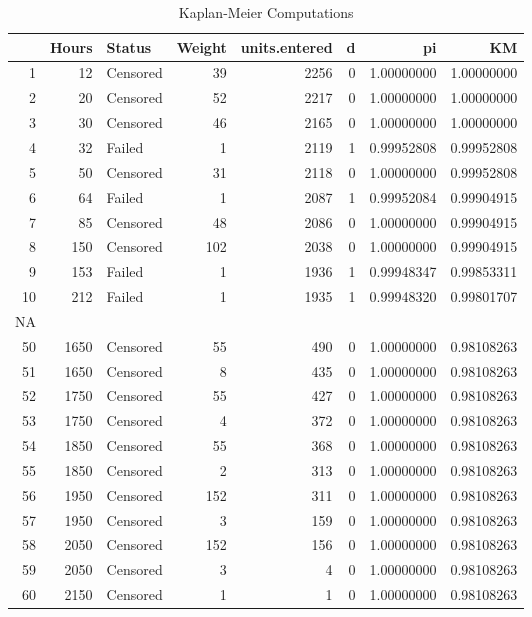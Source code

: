 \documentclass{article}
\begin{document}
\begin{center}
\begin{table}[ht]
\begin{center}
\begin{tabular}{rrlrrrrr}
  \hline
 & Hours & Status & Weight & units.entered & d & pi & KM \\ 
  \hline
1 & 12 & Censored & 39 & 2256 & 0 & 1.00000000 & 1.00000000 \\ 
  2 & 20 & Censored & 52 & 2217 & 0 & 1.00000000 & 1.00000000 \\ 
  3 & 30 & Censored & 46 & 2165 & 0 & 1.00000000 & 1.00000000 \\ 
  4 & 32 & Failed & 1 & 2119 & 1 & 0.99952808 & 0.99952808 \\ 
  5 & 50 & Censored & 31 & 2118 & 0 & 1.00000000 & 0.99952808 \\ 
  6 & 64 & Failed & 1 & 2087 & 1 & 0.99952084 & 0.99904915 \\ 
  7 & 85 & Censored & 48 & 2086 & 0 & 1.00000000 & 0.99904915 \\ 
  8 & 150 & Censored & 102 & 2038 & 0 & 1.00000000 & 0.99904915 \\ 
  9 & 153 & Failed & 1 & 1936 & 1 & 0.99948347 & 0.99853311 \\ 
  10 & 212 & Failed & 1 & 1935 & 1 & 0.99948320 & 0.99801707 \\ 
  NA &  &  &  &  &  &  &  \\ 
  50 & 1650 & Censored & 55 & 490 & 0 & 1.00000000 & 0.98108263 \\ 
  51 & 1650 & Censored & 8 & 435 & 0 & 1.00000000 & 0.98108263 \\ 
  52 & 1750 & Censored & 55 & 427 & 0 & 1.00000000 & 0.98108263 \\ 
  53 & 1750 & Censored & 4 & 372 & 0 & 1.00000000 & 0.98108263 \\ 
  54 & 1850 & Censored & 55 & 368 & 0 & 1.00000000 & 0.98108263 \\ 
  55 & 1850 & Censored & 2 & 313 & 0 & 1.00000000 & 0.98108263 \\ 
  56 & 1950 & Censored & 152 & 311 & 0 & 1.00000000 & 0.98108263 \\ 
  57 & 1950 & Censored & 3 & 159 & 0 & 1.00000000 & 0.98108263 \\ 
  58 & 2050 & Censored & 152 & 156 & 0 & 1.00000000 & 0.98108263 \\ 
  59 & 2050 & Censored & 3 & 4 & 0 & 1.00000000 & 0.98108263 \\ 
  60 & 2150 & Censored & 1 & 1 & 0 & 1.00000000 & 0.98108263 \\ 
   \hline
\end{tabular}
\caption{Kaplan-Meier Computations}
\label{tab:one}
\end{center}
\end{table}\end{center}
\end{document}
